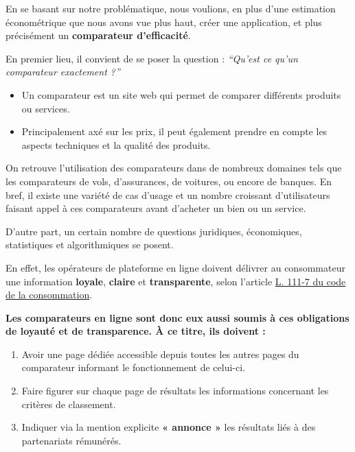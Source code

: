 \documentclass[
  12pt,
]{report}
\begin{document}
En se basant sur notre problématique, nous voulions, en plus d'une
estimation économétrique que nous avons vue plus haut, créer une
application, et plus précisément un \textbf{comparateur d'efficacité}.

En premier lieu, il convient de se poser la question : \emph{``Qu'est ce
qu'un comparateur exactement ?''}

\begin{tcolorbox}[enhanced jigsaw, rightrule=.15mm, opacityback=0, coltitle=black, colbacktitle=quarto-callout-tip-color!10!white, titlerule=0mm, title=\textcolor{quarto-callout-tip-color}{\faLightbulb}\hspace{0.5em}{Définition}, toptitle=1mm, arc=.35mm, leftrule=.75mm, breakable, bottomtitle=1mm, bottomrule=.15mm, colback=white, colframe=quarto-callout-tip-color-frame, toprule=.15mm, opacitybacktitle=0.6, left=2mm]

\begin{itemize}
\item
  Un comparateur est un site web qui permet de comparer différents
  produits ou services.
\item
  Principalement axé sur les prix, il peut également prendre en compte
  les aspects techniques et la qualité des produits.
\end{itemize}

\end{tcolorbox}

On retrouve l'utilisation des comparateurs dans de nombreux domaines
tels que les comparateurs de vols, d'assurances, de voitures, ou encore
de banques. En bref, il existe une variété de cas d'usage et un nombre
croissant d'utilisateurs faisant appel à ces comparateurs avant
d'acheter un bien ou un service.

D'autre part, un certain nombre de questions juridiques, économiques,
statistiques et algorithmiques se posent.

En effet, les opérateurs de plateforme en ligne doivent délivrer au
consommateur une information \textbf{loyale}, \textbf{claire} et
\textbf{transparente}, selon l'article
\href{https://www.legifrance.gouv.fr/codes/article_lc/LEGIARTI000033219601}{L.
111-7 du code de la consommation}.

\textbf{Les comparateurs en ligne sont donc eux aussi soumis à ces
obligations de loyauté et de transparence. À ce titre, ils doivent :}

\begin{enumerate}
\def\labelenumi{\arabic{enumi}.}
\item
  Avoir une page dédiée accessible depuis toutes les autres pages du
  comparateur informant le fonctionnement de celui-ci.
\item
  Faire figurer sur chaque page de résultats les informations concernant
  les critères de classement.
\item
  Indiquer via la mention explicite \textbf{« annonce »} les résultats
  liés à des partenariats rémunérés.
\end{enumerate}
\end{document}
